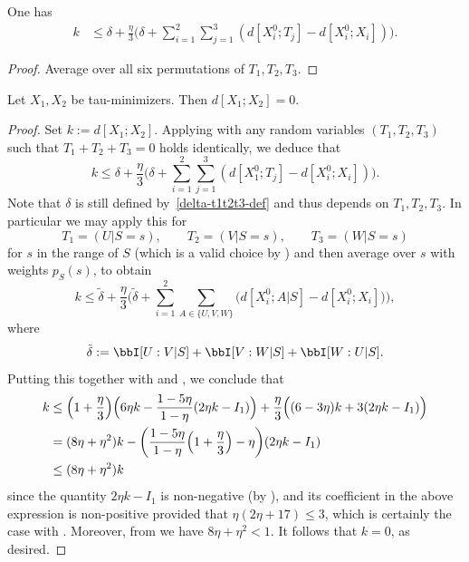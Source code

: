 \begin{lemma}\label{construct-good}
  \leanok
One has
\begin{align*}  k & \leq  \delta + \frac{\eta}{3} \biggl( \delta + \sum_{i=1}^2 \sum_{j = 1}^3 (d[X^0_i;T_j] - d[X^0_i; X_i]) \biggr).
  \end{align*}
\end{lemma}

\begin{proof}\leanok
Average  over all six permutations of $T_1,T_2,T_3$.
\end{proof}




\begin{theorem}\label{de-prop}
  \leanok
  Let $X_1, X_2$ be tau-minimizers.  Then $d[X_1;X_2] = 0$.
\end{theorem}

\begin{proof}
  \leanok
  Set $k := d[X_1;X_2]$.  Applying  with any random variables $(T_1,T_2,T_3)$ such that $T_1+T_2+T_3=0$ holds identically, we deduce that
\[
  k \leq \delta + \frac{\eta}{3} \biggl( \delta + \sum_{i=1}^2 \sum_{j = 1}^3 (d[X^0_1;T_j] - d[X^0_i;X_i]) \biggr).
\]
Note that $\delta$ is still defined by~\eqref{delta-t1t2t3-def} and thus depends on $T_1,T_2,T_3$.
In particular we may apply this for
\[
  T_1 = (U | S = s),\qquad T_2 = (V | S = s), \qquad T_3 = (W | S = s)
\]
for $s$ in the range of $S$ (which is a valid choice by ) and then average over $s$ with weights $p_S(s)$, to obtain
\[k \leq \tilde \delta + \frac{\eta}{3} \biggl( \tilde \delta + \sum_{i=1}^2 \sum_{A\in\{U,V,W\}} \bigl(  d[X^0_i;A|S] - d[X^0_i;X_i]\bigr) \biggr),\]
where
\[
  \tilde \delta :=  \bbI[U : V | S] + \bbI[V : W | S] + \bbI[W : U | S].
\]
Putting this together with  and , we conclude that
\begin{align*}
  k &\leq \Bigl(1+\frac{\eta}{3}\Bigr)\Bigl(6\eta k-\frac{1-5\eta}{1-\eta}(2\eta k-I_1)\Bigr)+\frac{\eta}{3}\Bigl((6-3\eta)k+3(2\eta k-I_1)\Bigr)\\
  &= (8\eta + \eta^2) k - \biggl( \frac{1 - 5 \eta}{1-\eta}\Bigl(1 + \frac{\eta}{3}\Bigr) -  \eta \biggr)(2 \eta k - I_1)\\
  &\leq (8 \eta + \eta^2) k
 \end{align*}
since the quantity $2 \eta k - I_1$ is non-negative (by ), and its coefficient in the above expression is non-positive provided that $\eta(2\eta + 17) \le 3$, which is certainly the case with .
Moreover, from  we have $8 \eta + \eta^2 < 1$. It follows that $k=0$, as desired.
\end{proof}


